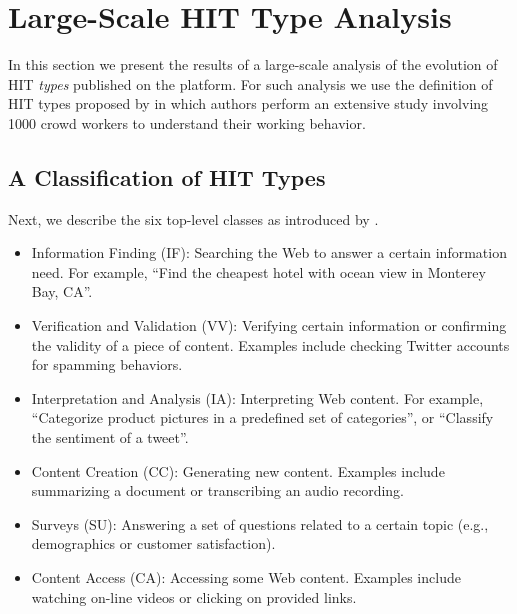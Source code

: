 \section{Large-Scale HIT Type Analysis}\label{sec:type}
In this section we present the results of a large-scale analysis of the evolution of HIT \emph{types} published on the \amt{} platform.
For such analysis we use the definition of HIT types proposed by \cite{Gadiraju:2014:TMW:2631775.2631819} in which authors perform an extensive study involving 1000 crowd workers to understand their working behavior. 

\subsection{A Classification of HIT Types}
Next, we describe the six top-level classes as introduced by \cite{Gadiraju:2014:TMW:2631775.2631819}.

\begin{itemize}[noitemsep,topsep=0pt,parsep=0pt,partopsep=0pt]

	\item Information Finding (IF): Searching the Web to answer a certain information need. For example, ``Find the cheapest hotel with ocean view in Monterey Bay, CA''.
	
	\item Verification and Validation (VV): Verifying certain information or confirming the validity of a piece of content. Examples include checking Twitter accounts for spamming behaviors.

	\item Interpretation and Analysis (IA): Interpreting Web content. For example, ``Categorize product pictures in a predefined set of categories'', or ``Classify the sentiment of a tweet''.
	
	\item Content Creation (CC): Generating new content. Examples include summarizing a document  or transcribing an audio recording.

	\item Surveys (SU): Answering a set of questions related to a certain topic (e.g., demographics or customer satisfaction). 
	
	\item Content Access (CA): Accessing some Web content. Examples include watching on-line videos or clicking on provided links.

\end{itemize}

